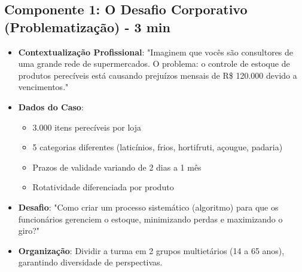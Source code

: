 \documentclass{lesson_plan}
\begin{document}
\subsection{Componente 1: O Desafio Corporativo (Problematização) - 3 min}
\begin{itemize}
    \item \textbf{Contextualização Profissional}: "Imaginem que vocês são consultores de uma grande rede de supermercados. O problema: o controle de estoque de produtos perecíveis está causando prejuízos mensais de R\$ 120.000 devido a vencimentos."
    \item \textbf{Dados do Caso}: 
    \begin{itemize}
        \item 3.000 itens perecíveis por loja
        \item 5 categorias diferentes (laticínios, frios, hortifruti, açougue, padaria)
        \item Prazos de validade variando de 2 dias a 1 mês
        \item Rotatividade diferenciada por produto
    \end{itemize}
    \item \textbf{Desafio}: "Como criar um processo sistemático (algoritmo) para que os funcionários gerenciem o estoque, minimizando perdas e maximizando o giro?"
    \item \textbf{Organização}: Dividir a turma em 2 grupos multietários (14 a 65 anos), garantindo diversidade de perspectivas.
\end{itemize}
\end{document}
